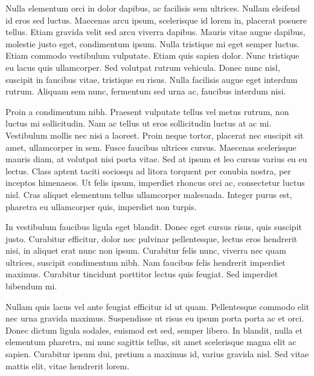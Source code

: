 Nulla elementum orci in dolor dapibus, ac facilisis sem ultrices. Nullam eleifend id eros sed luctus. Maecenas arcu ipsum, scelerisque id lorem in, placerat posuere tellus. Etiam gravida velit sed arcu viverra dapibus. Mauris vitae augue dapibus, molestie justo eget, condimentum ipsum. Nulla tristique mi eget semper luctus. Etiam commodo vestibulum vulputate. Etiam quis sapien dolor. Nunc tristique eu lacus quis ullamcorper. Sed volutpat rutrum vehicula. Donec nunc nisl, suscipit in faucibus vitae, tristique eu risus. Nulla facilisis augue eget interdum rutrum. Aliquam sem nunc, fermentum sed urna ac, faucibus interdum nisi.

Proin a condimentum nibh. Praesent vulputate tellus vel metus rutrum, non luctus mi sollicitudin. Nam ac tellus ut eros sollicitudin luctus at ac mi. Vestibulum mollis nec nisi a laoreet. Proin neque tortor, placerat nec suscipit sit amet, ullamcorper in sem. Fusce faucibus ultrices cursus. Maecenas scelerisque mauris diam, at volutpat nisi porta vitae. Sed at ipsum et leo cursus varius eu eu lectus. Class aptent taciti sociosqu ad litora torquent per conubia nostra, per inceptos himenaeos. Ut felis ipsum, imperdiet rhoncus orci ac, consectetur luctus nisl. Cras aliquet elementum tellus ullamcorper malesuada. Integer purus est, pharetra eu ullamcorper quis, imperdiet non turpis.

In vestibulum faucibus ligula eget blandit. Donec eget cursus risus, quis suscipit justo. Curabitur efficitur, dolor nec pulvinar pellentesque, lectus eros hendrerit nisi, in aliquet erat nunc non ipsum. Curabitur felis nunc, viverra nec quam ultrices, suscipit condimentum nibh. Nam faucibus felis hendrerit imperdiet maximus. Curabitur tincidunt porttitor lectus quis feugiat. Sed imperdiet bibendum mi.

Nullam quis lacus vel ante feugiat efficitur id ut quam. Pellentesque commodo elit nec urna gravida maximus. Suspendisse ut risus eu ipsum porta porta ac et orci. Donec dictum ligula sodales, euismod est sed, semper libero. In blandit, nulla et elementum pharetra, mi nunc sagittis tellus, sit amet scelerisque magna elit ac sapien. Curabitur ipsum dui, pretium a maximus id, varius gravida nisl. Sed vitae mattis elit, vitae hendrerit lorem. 


